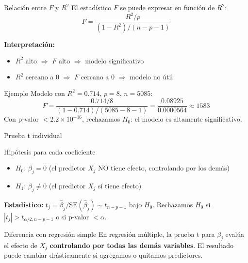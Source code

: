 \documentclass[aspectratio=169, 11pt]{beamer}
\begin{document}
\begin{frame}{Relación entre $F$ y $R^2$}
El estadístico $F$ se puede expresar en función de $R^2$:
\[
F = \frac{R^2 / p}{(1 - R^2)/(n - p - 1)}
\]

\vspace{0.2cm}
\textbf{Interpretación:}
\begin{itemize}
  \item $R^2$ alto $\Rightarrow$ $F$ alto $\Rightarrow$ modelo significativo
  \item $R^2$ cercano a 0 $\Rightarrow$ $F$ cercano a 0 $\Rightarrow$ modelo no útil
\end{itemize}

\vspace{0.3cm}
\begin{exampleblock}{Ejemplo}
Modelo con $R^2 = 0.714$, $p = 8$, $n = 5085$:
\[
F = \frac{0.714 / 8}{(1 - 0.714) / (5085 - 8 - 1)} = \frac{0.08925}{0.0000564} \approx 1583
\]
Con p-valor $< 2.2 \times 10^{-16}$, rechazamos $H_0$: el modelo es altamente significativo.
\end{exampleblock}
\end{frame}

\begin{frame}{Prueba t individual}
\begin{block}{Hip\'otesis para cada coeficiente}
\begin{itemize}
  \item $H_0$: $\beta_j = 0$ (el predictor $X_j$ NO tiene efecto, controlando por los dem\'as)
  \item $H_1$: $\beta_j \neq 0$ (el predictor $X_j$ s\'i tiene efecto)
\end{itemize}
\end{block}

\vspace{0.1cm}
\textbf{Estad\'istico:}
$t_j = \hat{\beta}_j / \text{SE}(\hat{\beta}_j) \sim t_{n - p - 1}$ bajo $H_0$.
Rechazamos $H_0$ si $|t_j| > t_{\alpha/2, n-p-1}$ o si p-valor $< \alpha$.

\vspace{0.1cm}
\begin{alertblock}{Diferencia con regresi\'on simple}
\small En regresi\'on m\'ultiple, la prueba t para $\beta_j$ eval\'ua el efecto de $X_j$ \textbf{controlando por todas las dem\'as variables}. El resultado puede cambiar dr\'asticamente si agregamos o quitamos predictores.
\end{alertblock}
\end{frame}
\end{document}
